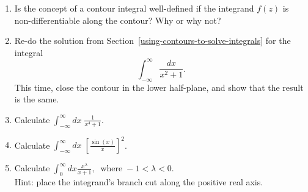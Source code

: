 \documentclass[10pt,a4paper]{article}
\begin{document}
\begin{enumerate}
\item
Is the concept of a contour integral well-defined if the integrand
$f(z)$ is non-differentiable along the contour? Why or why not?

\item
  Re-do the solution from
  Section~\ref{using-contours-to-solve-integrals} for the integral
\begin{equation*}
  \int_{-\infty}^\infty \frac{dx}{x^2 + 1}.  
\end{equation*}
This time, close the contour in the lower half-plane, and show that
the result is the same.

\item Calculate $\displaystyle \int_{-\infty}^\infty dx\; \frac{1}{x^4 + 1}$.

\item Calculate
$\displaystyle \int_{-\infty}^\infty dx\; \left[\frac{\sin(x)}{x}\right]^2$.

\item
  Calculate
$\displaystyle\int_0^\infty dx \frac{x^{\lambda}}{x+1}, \;\;\mathrm{where}\; -1 < \lambda < 0$. \\
Hint: place the integrand's branch cut along the positive real axis.

\end{enumerate}
\end{document}
